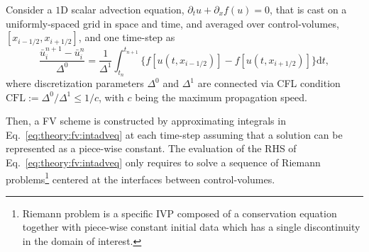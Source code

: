 Consider a $1$D scalar advection equation, 
$\partial_t u + \partial_x f(u) = 0$, 
that is cast on a uniformly-spaced grid in space and time, 
and averaged over control-volumes, $[x_{i-1/2},x_{i+1/2}]$, 
%
and one time-step as 
%
\begin{equation}
    \frac{\bar{u}_{i}^{n+1}-\bar{u}_{i}^{n}}{\Delta^0} = \frac{1}{\Delta^1}\int_{t_n}^{t_{n+1}}\big\{f[u(t,x_{i-1/2})] - f[u(t,x_{i+1/2})]\big\}\text{d}t,
    \label{eq:theory:fv:intadveq}
\end{equation}
where discretization parameters $\Delta^0$ and $\Delta^1$ are connected via \ac{CFL} 
condition $ \text{CFL}:= \Delta^0 / \Delta^1 \leq 1/c$, with $c$ being the 
maximum propagation speed.

Then, a \ac{FV} scheme is constructed by approximating integrals in 
Eq.~\eqref{eq:theory:fv:intadveq} at each time-step 
assuming that a solution can be represented as a piece-wise constant.
%
The evaluation of the \ac{RHS} of Eq.~\eqref{eq:theory:fv:intadveq} only requires to solve a sequence of Riemann problems\footnote{
    Riemann problem is a specific \ac{IVP} composed of a conservation equation together with piece-wise constant initial data which has a single discontinuity in the domain of interest. 
} centered at the interfaces between control-volumes.


